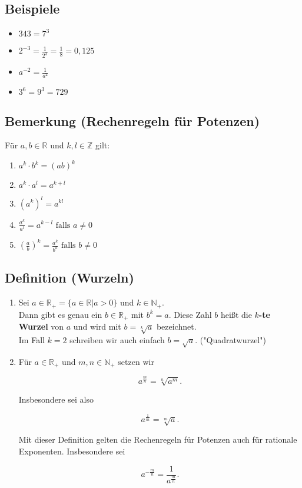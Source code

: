 \subsection{Beispiele}
	
	\begin{itemize}
	
		\item $343=7^3$
		\item $2^{-3}=\frac{1}{2^3}=\frac{1}{8}=0,125$
		\item $a^{-2}=\frac{1}{a^2}$
		\item $3^6=9^3=729$
		
	\end{itemize}
	
	
\subsection[Rechenregeln für Potenzen]{Bemerkung (Rechenregeln für Potenzen)}

	Für $a,b\in\mathbb{R}$ und $k,l\in\mathbb{Z}$ gilt:
	
	\begin{enumerate}
	
		\item $a^k\cdot b^k=(ab)^k$
		\item $a^k\cdot a^l=a^{k+l}$
		\item ${\left(a^k\right)}^l=a^{kl}$
		\item $\frac{a^k}{a^l}=a^{k-l}\text{ falls }a\neq 0$
		\item ${\left(\frac{a}{b}\right)}^k=\frac{a^k}{b^k}\text{ falls }b\neq 0$
		
	\end{enumerate}
	
	
\subsection[Wurzeln]{Definition (Wurzeln)}

	\begin{enumerate}
		\item Sei $a\in\mathbb{R_+}=\{a\in\mathbb{R}|a>0\}$ und $k\in\mathbb{N_+}$.\\
		Dann gibt es genau ein $b\in\mathbb{R_+}$ mit $b^k=a$. Diese Zahl $b$ heißt
		die \textbf{$k$-te Wurzel} von $a$ und wird mit $b=\sqrt[k]{a}$ bezeichnet.\\
		Im Fall $k=2$ schreiben wir auch einfach $b=\sqrt{a}$. ("Quadratwurzel")
	
		\item Für $a\in\mathbb{R_+}$ und $m,n\in\mathbb{N_+}$ setzen wir

		 \[
		 	a^{\frac{m}{n}}=\sqrt[n]{a^m}\text{.}
		 \]

		Insbesondere sei also

		\[
			a^{\frac{1}{m}}=\sqrt[m]{a}\text{.}
		\]

		Mit dieser Definition gelten die Rechenregeln für Potenzen auch für rationale
		Exponenten. Insbesondere sei

		\[
			a^{-\frac{m}{n}}=\frac{1}{a^{\frac{m}{n}}}\text{.}
		\]
		
	\end{enumerate}
	
